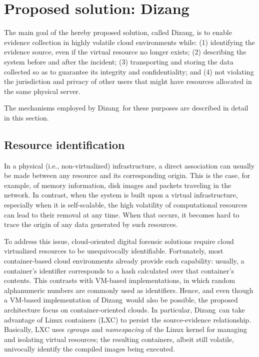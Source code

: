 \documentclass[twocolumn, notitlepage]{bmcart}%
\newcommand{\fancyname}{Dizang}
\begin{document}
\section*{Proposed solution: \fancyname}
\label{sec:proposal}

The main goal of the hereby proposed solution, called \fancyname, is to enable evidence collection in highly volatile cloud environments while:
(1) identifying the evidence source, even if the virtual resource no longer exists; 
(2) describing the system before and after the incident;
(3) transporting and storing the data collected so as to guarantee its integrity and confidentiality; and
(4) not violating the jurisdiction and privacy of other users that might have resources allocated in the same physical server.


The mechanisms employed by \fancyname\ for these purposes are described in detail in this section.


\subsection*{Resource identification}
\label{sec:proposal-desc-id}

In a physical (i.e., non-virtualized) infrastructure, a direct association can usually be made between any resource and its corresponding origin.
%
This is the case, for example, of memory information, disk images and packets traveling in the network.
%
In contrast, when the system is built upon a virtual infrastructure, especially when it is self-scalable, the high volatility of computational resources can lead to their removal at any time.
%
When that occurs, it becomes hard to trace the origin of any data generated by such resources.


To address this issue, cloud-oriented digital forensic solutions require cloud virtualized resources to be unequivocally identifiable.
%
Fortunately, most container-based cloud environments already provide such capability: usually, a container's identifier corresponds to a hash calculated over that container's contents.
%
This contrasts with VM-based implementations, in which random alphanumeric numbers are commonly used as identifiers.
%
Hence, and even though a VM-based implementation of \fancyname\ would also be possible, the proposed architecture focus on container-oriented clouds.
%
In particular, \fancyname\ can take advantage of Linux containers (LXC) to persist the source-evidence relationship.
%
Basically, LXC uses \textit{cgroups} and \textit{namespacing} of the Linux kernel for managing and isolating virtual resources; the resulting containers, albeit still volatile, univocally identify the compiled images being executed.
\end{document}
